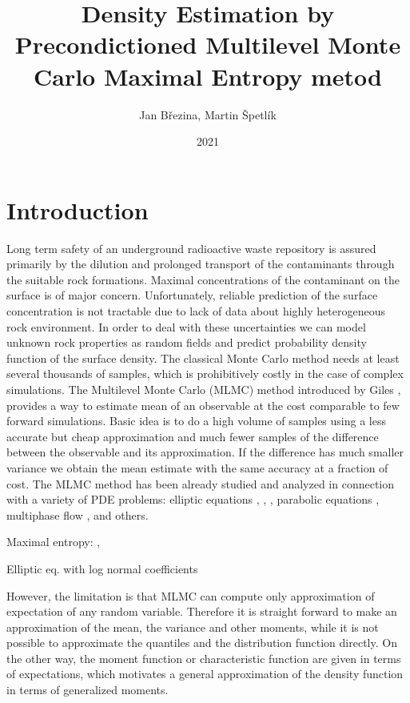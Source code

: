 \documentclass{article}
\title{Density Estimation by \\Precondictioned Multilevel Monte Carlo
Maximal Entropy metod}
\author{Jan Březina, Martin Špetlík}
\date{2021}
\begin{document}
\maketitle

\section{Introduction}
Long term safety of an underground radioactive waste repository is assured primarily by the dilution and 
prolonged transport of the contaminants through the suitable rock formations. Maximal concentrations of the contaminant on the surface is of major concern. Unfortunately, reliable prediction of the surface concentration is not tractable due to lack of data about highly heterogeneous rock environment. In order to deal with these uncertainties we can model unknown rock properties as random fields and predict probability density function of the surface density. 
The classical Monte Carlo method needs at least several thousands of samples, which is prohibitively costly in the case of complex simulations. The Multilevel Monte Carlo (MLMC) method introduced by Giles \cite{Giles2008}, \cite{Giles2015} provides a way to estimate mean of an observable at the cost comparable to few forward simulations. Basic idea is to do a high volume of samples using a less accurate but cheap approximation and much fewer samples of the difference between the observable and its approximation. If the difference has much smaller variance we obtain the mean estimate with the same accuracy at a fraction of cost.  The MLMC method has been already studied and analyzed in connection with a variety of PDE problems: elliptic equations \cite{Barth2011a}, \cite{Cliffe2011a}, \cite{Abdulle2013}, parabolic equations \cite{Barth2013},
multiphase flow \cite{Muller2013}, \cite{Lu2016} and others.


Maximal entropy:
\cite{Barron1991}, \cite{Bierig2016a}

Elliptic eq. with log normal coefficients \cite{Graham2015}






 However, the limitation is that MLMC can compute only approximation of expectation of any random variable. Therefore it is straight forward to make an approximation of the mean, the variance and other moments, while it is not possible to approximate the quantiles and the distribution function directly. On the other way, the moment function or characteristic function are given in terms of expectations, which motivates a general approximation of the density function in terms of generalized moments.
\end{document}
